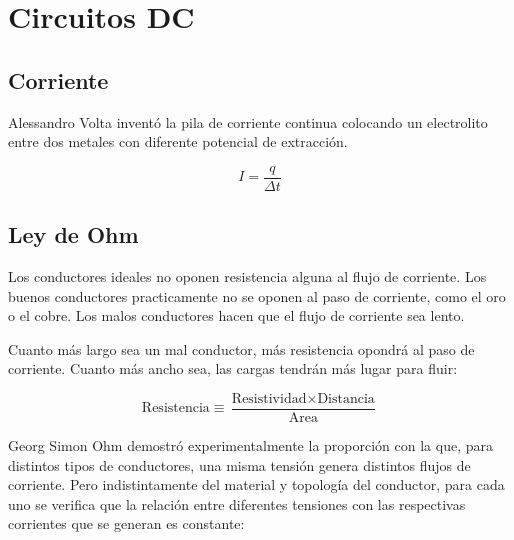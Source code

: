 \chapter{Circuitos DC}

\renewcommand{\voltage}{V}
\renewcommand{\current}{I}

\section{Corriente}

Alessandro Volta inventó la pila de corriente continua colocando un electrolito entre dos metales con diferente potencial de extracción.

\begin{mdframed}[style=DefinitionFrame]
    \begin{defn}
    \end{defn}
    \begin{equation*}
        I = \frac{q}{\Delta t}
    \end{equation*}
\end{mdframed}


\section{Ley de Ohm}

Los conductores ideales no oponen resistencia alguna al flujo de corriente.
Los buenos conductores practicamente no se oponen al paso de corriente, como el oro o el cobre.
Los malos conductores hacen que el flujo de corriente sea lento.

Cuanto más largo sea un mal conductor, más resistencia opondrá al paso de corriente.
Cuanto más ancho sea, las cargas tendrán más lugar para fluir:

\begin{equation*}
    \text{Resistencia} \equiv \frac{\text{Resistividad} \times \text{Distancia}}{\text{Area}}
\end{equation*}

Georg Simon Ohm demostró experimentalmente la proporción con la que, para distintos tipos de conductores, una misma tensión genera distintos flujos de corriente.
Pero indistintamente del material y topología del conductor, para cada uno se verifica que la relación entre diferentes tensiones con las respectivas corrientes que se generan es constante:

